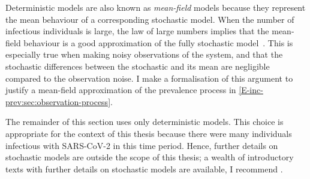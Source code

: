 \documentclass[thesis.tex]{subfiles}
\begin{document}
Deterministic models are also known as \emph{mean-field} models because they represent the mean behaviour of a corresponding stochastic model.
When the number of infectious individuals is large, the law of large numbers implies that the mean-field behaviour is a good approximation of the fully stochastic model~\autocite[20]{diekmannMathematical}.
This is especially true when making noisy observations of the system, and that the stochastic differences between the stochastic and its mean are negligible compared to the observation noise.
I make a formalisation of this argument to justify a mean-field approximation of the prevalence process in \cref{E-inc-prev:sec:observation-process}.

The remainder of this section uses only deterministic models.
This choice is appropriate for the context of this thesis because there were many individuals infectious with SARS-CoV-2 in this time period.
Hence, further details on stochastic models are outside the scope of this thesis; a wealth of introductory texts with further details on stochastic models are available, I recommend \textcite[chapter 6]{keelingModeling}.




\end{document}
